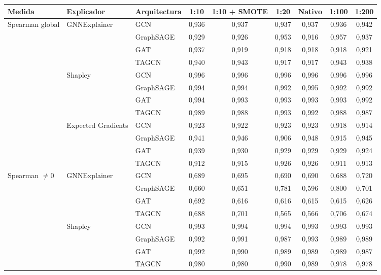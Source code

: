 \begin{tabular}{lllcccccc}
\toprule
Medida & Explicador & Arquitectura & 1:10 & 1:10 + SMOTE & 1:20 & Nativo & 1:100 & 1:200 \\
\midrule
Spearman global & GNNExplainer & GCN & 0{,}936 & 0{,}937 & 0{,}937 & 0{,}937 & 0{,}936 & 0{,}942 \\
 &  & GraphSAGE & 0{,}929 & 0{,}926 & 0{,}953 & 0{,}916 & 0{,}957 & 0{,}937 \\
 &  & GAT & 0{,}937 & 0{,}919 & 0{,}918 & 0{,}918 & 0{,}918 & 0{,}921 \\
 &  & TAGCN & 0{,}940 & 0{,}943 & 0{,}917 & 0{,}917 & 0{,}943 & 0{,}938 \\
 & Shapley & GCN & 0{,}996 & 0{,}996 & 0{,}996 & 0{,}996 & 0{,}996 & 0{,}996 \\
 &  & GraphSAGE & 0{,}994 & 0{,}994 & 0{,}992 & 0{,}995 & 0{,}992 & 0{,}992 \\
 &  & GAT & 0{,}994 & 0{,}993 & 0{,}993 & 0{,}993 & 0{,}993 & 0{,}992 \\
 &  & TAGCN & 0{,}989 & 0{,}988 & 0{,}993 & 0{,}992 & 0{,}988 & 0{,}987 \\
 & Expected Gradients & GCN & 0{,}923 & 0{,}922 & 0{,}923 & 0{,}923 & 0{,}918 & 0{,}914 \\
 &  & GraphSAGE & 0{,}941 & 0{,}946 & 0{,}906 & 0{,}948 & 0{,}915 & 0{,}945 \\
 &  & GAT & 0{,}939 & 0{,}930 & 0{,}929 & 0{,}929 & 0{,}929 & 0{,}924 \\
 &  & TAGCN & 0{,}912 & 0{,}915 & 0{,}926 & 0{,}926 & 0{,}911 & 0{,}913 \\
\midrule
Spearman $\neq 0$ & GNNExplainer & GCN & 0{,}689 & 0{,}695 & 0{,}690 & 0{,}690 & 0{,}688 & 0{,}720 \\
 &  & GraphSAGE & 0{,}660 & 0{,}651 & 0{,}781 & 0{,}596 & 0{,}800 & 0{,}701 \\
 &  & GAT & 0{,}692 & 0{,}616 & 0{,}616 & 0{,}615 & 0{,}615 & 0{,}626 \\
 &  & TAGCN & 0{,}688 & 0{,}701 & 0{,}565 & 0{,}566 & 0{,}706 & 0{,}674 \\
 & Shapley & GCN & 0{,}993 & 0{,}994 & 0{,}994 & 0{,}993 & 0{,}993 & 0{,}993 \\
 &  & GraphSAGE & 0{,}992 & 0{,}991 & 0{,}987 & 0{,}993 & 0{,}989 & 0{,}989 \\
 &  & GAT & 0{,}992 & 0{,}990 & 0{,}989 & 0{,}989 & 0{,}989 & 0{,}987 \\
 &  & TAGCN & 0{,}980 & 0{,}980 & 0{,}990 & 0{,}989 & 0{,}978 & 0{,}978 \\

\end{tabular}
